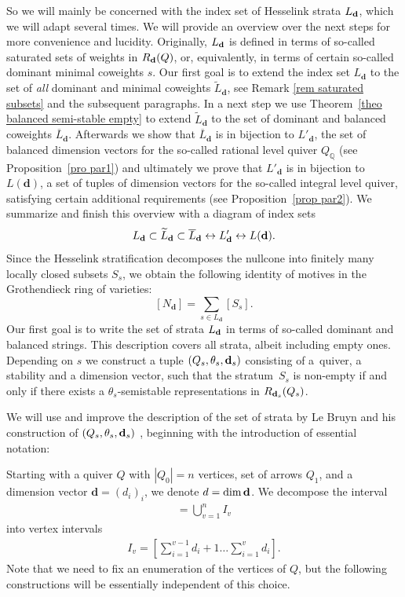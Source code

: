 \documentclass[10pt,a4paper]{amsart}
\numberwithin{equation}{section}
\theoremstyle{definition}
\begin{document}
So we will mainly be concerned with the index set of Hesselink strata $L_{\bf d}$, which we will adapt several times. We will provide an overview over the next steps for more convenience and lucidity. Originally, $L_{\bf d}$ is defined in terms of so-called saturated sets of weights in $R_{\bf d}(Q)$, or, equivalently, in terms of certain so-called dominant minimal coweights $s$. Our first goal is to extend the index set $L_{\mathbf{d}}$ to the set of {\it all} dominant and minimal coweights $\widetilde{L}_{\mathbf{d}}$, see Remark \ref{rem saturated subsets} and the subsequent paragraphs. In a next step we use Theorem~\ref{theo balanced semi-stable empty} to extend $\widetilde{L}_{\mathbf{d}}$ to the set of dominant and balanced coweights $\overline{L}_{\mathbf{d}}$. Afterwards we show that $\overline{L}_{\mathbf{d}}$ is in bijection to $L'_{\mathbf{d}}$, the set of balanced dimension vectors for the so-called rational level quiver $Q_{\mathbb{Q}}$ (see Proposition~\ref{pro par1}) and ultimately we prove that $L'_{\mathbf{d}}$ is in bijection to $L(\mathbf{d})$, a set of tuples of dimension vectors for the so-called integral level quiver, satisfying certain additional requirements (see Proposition~\ref{prop par2}). We summarize and finish this overview with a diagram of index sets
\[L_{\bf d}\subset\widetilde{L}_{\bf d}\subset\overline{L}_{\bf d}\leftrightarrow L_{\bf d}'\leftrightarrow L({\bf d}).\]
Since the Hesselink stratification decomposes the nullcone into finitely many locally closed subsets $S_s$, we obtain the following identity of motives in the Grothendieck ring of varieties:
\begin{equation}\label{iom}
[N_{\mathbf{d}}] = \sum_{s \in L_{\mathbf{d}}} [S_s] .
\end{equation}
Our first goal is to write the set of strata $L_{\bf d}$ in terms of so-called dominant and balanced strings. This description covers all strata, albeit including empty ones. Depending on $s$ we construct a tuple $(Q_s, \theta_s, {\bf d}_s)$ consisting of a~quiver, a stability and a dimension vector, such that the stratum~$S_s$ is non-empty if and only if there exists a $\theta_s$-semistable representations in $R_{{\bf d}_s}(Q_s)$.

We will use and improve the description of the set of strata by Le Bruyn and his construction of $(Q_s, \theta_s, {\bf d}_s)$ \cite{LB}, beginning with the introduction of essential notation:

Starting with a quiver $Q$ with $|Q_0| = n$ vertices, set of arrows $Q_1$, and a dimension vector $\mathbf{d}=(d_i)_i$, we denote $d = \dim{\bf d}$. We decompose the interval
\begin{align*}
 [1 \dots d] = \bigcup_{v=1}^n I_v
\end{align*}
into vertex intervals
\begin{align*}
I_v = \left[ \sum_{i=1}^{v-1} d_i +1 \dots \sum_{i=1}^v d_i\right] .
\end{align*}
Note that we need to fix an enumeration of the vertices of $Q$, but the following constructions will be essentially independent of this choice.
\end{document}
